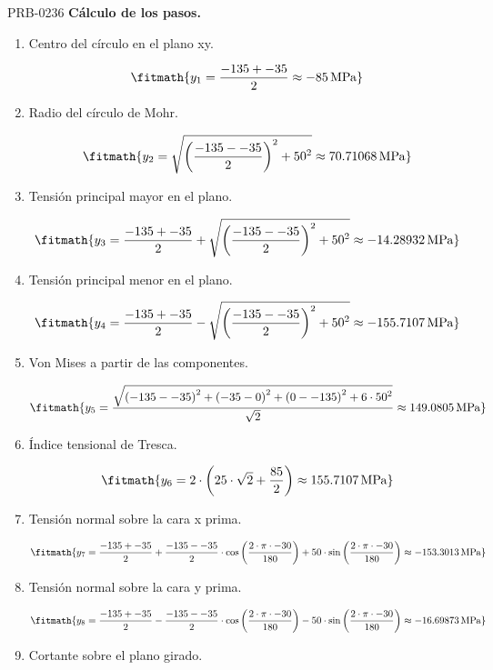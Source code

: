 \begin{studiumworked}{PRB-0236}
\textbf{Cálculo de los pasos.}

\begin{enumerate}

\item Centro del círculo en el plano xy.

\[\fitmath{y_{1}=\frac{-135+-35}{2}\approx -85\,\mathrm{MPa}}\]

\item Radio del círculo de Mohr.

\[\fitmath{y_{2}=\sqrt{{\left(\frac{-135--35}{2}\right)}^{2}+{50}^{2}}\approx 70.71068\,\mathrm{MPa}}\]

\item Tensión principal mayor en el plano.

\[\fitmath{y_{3}=\frac{-135+-35}{2}+\sqrt{{\left(\frac{-135--35}{2}\right)}^{2}+{50}^{2}}\approx -14.28932\,\mathrm{MPa}}\]

\item Tensión principal menor en el plano.

\[\fitmath{y_{4}=\frac{-135+-35}{2}-\sqrt{{\left(\frac{-135--35}{2}\right)}^{2}+{50}^{2}}\approx -155.7107\,\mathrm{MPa}}\]

\item Von Mises a partir de las componentes.

\[\fitmath{y_{5}=\frac{\sqrt{{\left(-135--35\right)}^{2}+{\left(-35-0\right)}^{2}+{\left(0--135\right)}^{2}+6\cdot {50}^{2}}}{\sqrt{2}}\approx 149.0805\,\mathrm{MPa}}\]

\item Índice tensional de Tresca.

\[\fitmath{y_{6}=2\cdot \left(25\cdot \sqrt{2}+\frac{85}{2}\right)\approx 155.7107\,\mathrm{MPa}}\]

\item Tensión normal sobre la cara x prima.

\[\fitmath{y_{7}=\frac{-135+-35}{2}+\frac{-135--35}{2}\cdot \cos\left(\frac{2\cdot \pi\cdot -30}{180}\right)+50\cdot \sin\left(\frac{2\cdot \pi\cdot -30}{180}\right)\approx -153.3013\,\mathrm{MPa}}\]

\item Tensión normal sobre la cara y prima.

\[\fitmath{y_{8}=\frac{-135+-35}{2}-\frac{-135--35}{2}\cdot \cos\left(\frac{2\cdot \pi\cdot -30}{180}\right)-50\cdot \sin\left(\frac{2\cdot \pi\cdot -30}{180}\right)\approx -16.69873\,\mathrm{MPa}}\]

\item Cortante sobre el plano girado.


\end{enumerate}
\end{studiumworked}
